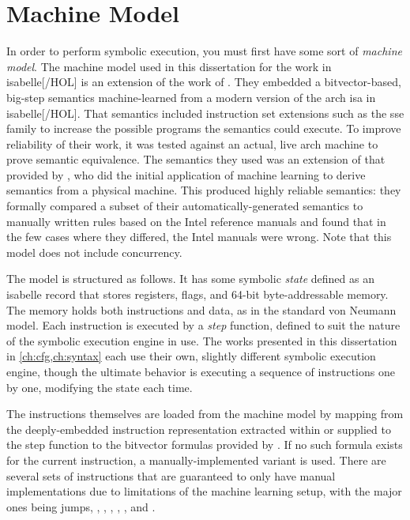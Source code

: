 \section{Machine Model}\label{se:machine_model}
In order to perform symbolic execution,
you must first have some sort of \emph{machine model}.%
The machine model used in this dissertation for the work in \gls{isabelle}[/HOL] is an extension of the work of \textcite{roessle2019verified}.
They embedded a bitvector-based, big-step semantics
machine-learned from a modern version of the \gls{arch} \ac{isa} in \gls{isabelle}[/HOL].
That semantics included instruction set extensions such as the \ac{sse} family
to increase the possible programs the semantics could execute.
To improve reliability of their work,
it was tested against an actual, live \gls{arch} machine to prove semantic equivalence.
The semantics they used was an extension of that provided by \textcite{heule2016stratified},
who did the initial application of machine learning
to derive semantics from a physical machine.
This produced highly reliable semantics:
they formally compared a subset of their automatically-generated semantics
to manually written rules based on the Intel reference manuals
and found that in the few cases where they differed, the Intel manuals were wrong.
Note that this model does not include concurrency.

The model is structured as follows.
It has some symbolic \emph{state} defined as an \gls{isabelle} record
that stores registers, flags, and 64-bit byte-addressable memory.
The memory holds both instructions and data, as in the standard von Neumann model.%
Each instruction is executed by a \emph{step} function,%
defined to suit the nature of the symbolic execution engine in use.
The works presented in this dissertation in \cref{ch:cfg,ch:syntax}
each use their own, slightly different symbolic execution engine,
though the ultimate behavior is executing a sequence of instructions one by one,
modifying the state each time.

The instructions themselves are loaded from the machine model
by mapping from the deeply-embedded instruction representation
extracted within or supplied to the step function
to the bitvector formulas provided by \textcite{roessle2019verified}.
If no such formula exists for the current instruction,
a manually-implemented variant is used.
There are several sets of instructions
that are guaranteed to only have manual implementations due to limitations
of the machine learning setup, with the major ones being
jumps, , , , ,
, and .

